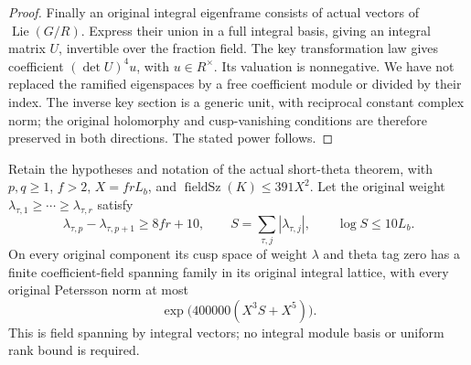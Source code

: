 \begin{proof}
Finally an original integral eigenframe consists of actual vectors
of $\operatorname{Lie}(G/R)$.  Express their union in a full
integral basis, giving an integral matrix $U$, invertible over the
fraction field.  The key transformation law gives coefficient
$(\det U)^4u$, with $u\in R^\times$.  Its valuation is
nonnegative.  We have not replaced the ramified eigenspaces by a
free coefficient module or divided by their index.  The inverse
key section is a generic unit, with reciprocal constant complex
norm; the original holomorphy and cusp-vanishing conditions are
therefore preserved in both directions.  The stated power follows.
\end{proof}

\begin{theorem}\label{thm:actual-shifted-short-span}
Retain the hypotheses and notation of the actual short-theta
theorem, with $p,q\ge1$, $f>2$, $X=frL_b$, and
$\operatorname{fieldSz}(K)\le391X^2$.
Let the original weight $\lambda_{\tau,1}\ge\cdots\ge
\lambda_{\tau,r}$ satisfy
\[
 \lambda_{\tau,p}-\lambda_{\tau,p+1}\ge8fr+10,
 \qquad S=\sum_{\tau,j}|\lambda_{\tau,j}|,
 \qquad\log S\le10L_b.
\]
On every original component its cusp space of weight $\lambda$
and theta tag zero has a finite coefficient-field spanning family
in its original integral lattice, with every original Petersson
norm at most
\[
                  \exp\bigl(400000(X^3S+X^5)\bigr).
\]
This is field spanning by integral vectors; no integral module
basis or uniform rank bound is required.
\end{theorem}

